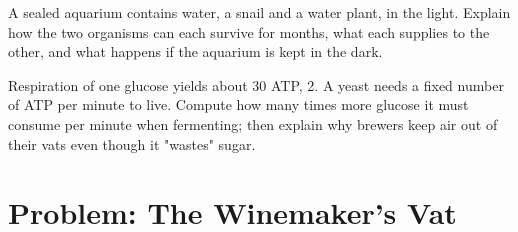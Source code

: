 \begin{exercise}[$\star\star\star$]\label{exo:g10:cell-metabolism:14}
A sealed aquarium contains water, a snail and a water plant, in the
light. Explain how the two organisms can each survive for months,
what each supplies to the other, and what happens if the aquarium is
kept in the dark.
\end{exercise}

\begin{exercise}[$\star\star\star$]\label{exo:g10:cell-metabolism:15}
Respiration of one glucose yields about 30 ATP,  2. A
yeast  needs a fixed number of ATP per minute to live. Compute how
many times more glucose it must consume per minute when fermenting;
then explain why brewers keep air out of their vats even though it
"wastes" sugar.
\end{exercise}

\section{Problem: The Winemaker's Vat}

